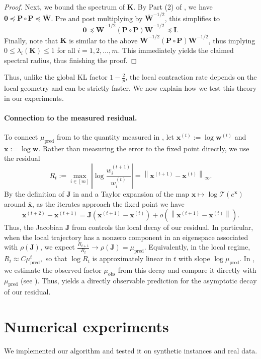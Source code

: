 \documentclass[11pt]{article}
\theoremstyle{plain}
\numberwithin{equation}{section}
\newcommand{\bI}{\mathbf{I}}
\newcommand{\bJ}{\mathbf{J}}
\newcommand{\bK}{\mathbf{K}}
\newcommand{\bP}{\mathbf{P}}
\newcommand{\bzero}{\mathbf{0}}
\newcommand{\bw}{\mathbf{w}}
\newcommand{\bx}{\mathbf{x}}
\newcommand{\bxbar}{\overline{\mathbf{x}}}
\newcommand{\bwbar}{\overline{\mathbf{w}}}
\newcommand{\bWbar}{\overline{\mathbf{W}}}
\newcommand{\calT}{\mathcal{T}}
\begin{document}
\begin{proof}
Next, we bound the spectrum of $\bK$. By Part (2) of \cite[Lemma~47]{lee2019solving}, we have 
$
    \bzero
    \preceq
    \bP\circ\bP
    \preceq
    \bWbar.
$
Pre and post multiplying by $\bWbar^{-1/2}$, this simplifies to 
\[
    \bzero
    \preceq
    \bWbar^{-1/2}
    (\bP\circ\bP)
    \bWbar^{-1/2}
    \preceq
    \bI.
\] Finally, note that $\bK$ is similar to the above $\bWbar^{-1/2}(\bP\circ\bP)\bWbar^{-1/2}$, thus implying $0\leq \lambda_i(\bK)\leq 1$ for all $i = 1, 2, \dotsc, m$. This immediately yields the claimed spectral radius, thus finishing the proof. 
\end{proof}

\noindent Thus, unlike the global KL factor $1-\frac{2}{p}$, the local contraction rate depends on the local geometry and can be strictly faster. We now explain how we test this theory in our experiments. 

\paragraph{Connection to the measured residual.}
To connect $\mu_{\mathrm{pred}}$ from  to the quantity measured in , let $\bx^{(t)}:=\log\bw^{(t)}$ and $\bxbar:=\log\bwbar$. 
Rather than measuring the error to the fixed point directly, we use the residual 
\[
R_t
:=
\max_{i\in[m]}
\left|
\log\frac{w_i^{(t+1)}}{w_i^{(t)}}
\right|
=
\left\|
\bx^{(t+1)}-\bx^{(t)}
\right\|_\infty.
\]
By the definition of $\bJ$ in  and a Taylor expansion of the map $\bx\mapsto\log\calT(e^{\bx})$ around $\bxbar$, as the iterates approach the fixed point we have
\[
\bx^{(t+2)}-\bx^{(t+1)}
=
\bJ\left(\bx^{(t+1)}-\bx^{(t)}\right)
+
o\left(
\left\|\bx^{(t+1)}-\bx^{(t)}\right\|
\right).
\]Thus, the Jacobian $\bJ$ from  controls the local decay of our residual.
In particular, when the local trajectory has a nonzero component in an eigenspace associated with $\rho(\bJ)$, we expect $
\frac{R_{t+1}}{R_t}
\longrightarrow
\rho(\bJ)
=
\mu_{\mathrm{pred}}.$ 
Equivalently, in the local regime,
$
R_t \approx C\mu_{\mathrm{pred}}^t,
$ 
so that $\log R_t$ is approximately linear in $t$ with slope $\log\mu_{\mathrm{pred}}$. 
In , we estimate the observed factor $\mu_{\mathrm{obs}}$ from this decay and compare it directly with $\mu_{\mathrm{pred}}$ (see ). Thus,  yields a directly observable prediction for the asymptotic decay of our residual.

\section{Numerical experiments}
\label{sec:expts}
We implemented our algorithm and tested it on synthetic instances and real data. 
\end{document}
